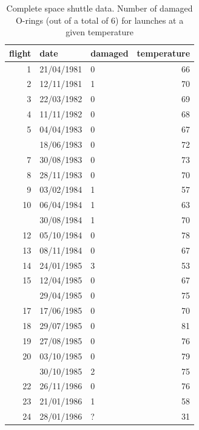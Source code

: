 \documentclass[
  british,
]{book}
\begin{document}
\begin{table}

\caption{\label{tab:tabshuttle2}Complete space shuttle data.  Number of damaged O-rings (out of a total of 6) for launches at a given temperature}
\centering
\begin{tabular}[t]{rllr}
\toprule
flight & date & damaged & temperature\\
\midrule
1 & 21/04/1981 & 0 & 66\\
2 & 12/11/1981 & 1 & 70\\
3 & 22/03/1982 & 0 & 69\\
4 & 11/11/1982 & 0 & 68\\
5 & 04/04/1983 & 0 & 67\\
\addlinespace
6 & 18/06/1983 & 0 & 72\\
7 & 30/08/1983 & 0 & 73\\
8 & 28/11/1983 & 0 & 70\\
9 & 03/02/1984 & 1 & 57\\
10 & 06/04/1984 & 1 & 63\\
\addlinespace
11 & 30/08/1984 & 1 & 70\\
12 & 05/10/1984 & 0 & 78\\
13 & 08/11/1984 & 0 & 67\\
14 & 24/01/1985 & 3 & 53\\
15 & 12/04/1985 & 0 & 67\\
\addlinespace
16 & 29/04/1985 & 0 & 75\\
17 & 17/06/1985 & 0 & 70\\
18 & 29/07/1985 & 0 & 81\\
19 & 27/08/1985 & 0 & 76\\
20 & 03/10/1985 & 0 & 79\\
\addlinespace
21 & 30/10/1985 & 2 & 75\\
22 & 26/11/1986 & 0 & 76\\
23 & 21/01/1986 & 1 & 58\\
24 & 28/01/1986 & ? & 31\\
\bottomrule
\end{tabular}
\end{table}
\end{document}
